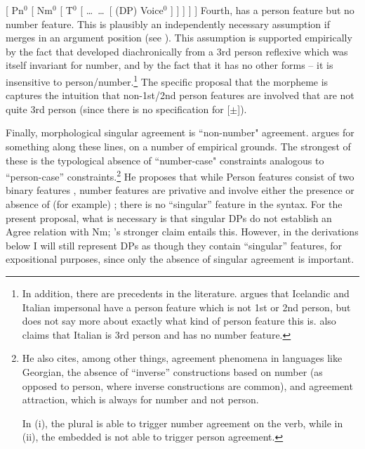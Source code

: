 \documentclass[output=paper]{langscibook}
\begin{document}
\ea
{ [ Pn$^0$ [ Nm$^0$ [ T$^0$ [ \dots\ \sti \dots\ [ (DP) Voice$^0$ ] ] ] ] ] }
\z
Fourth, \sti{} has a person feature but no number feature. This is plausibly an independently necessary assumption if \sti merges in an argument position (see \citealt{Wood2015book}). This assumption is supported empirically by the fact that \sti developed diachronically from a 3rd person reflexive which was itself invariant for number, and by the fact that it has no other forms -- it is insensitive to person\slash number.\footnote{In addition, there are precedents in the literature. \citet{DAlessandro:2003oy} argues that Icelandic \sti and Italian impersonal  have a person feature which is not 1st or 2nd person, but does not say more about exactly what kind of person feature this is. \citet{Taraldsen:1995om} also claims that Italian  is 3rd person and has no number feature.} The specific proposal that the morpheme is  captures the intuition that non-1st/2nd person features are involved that are not quite 3rd person (since there is no specification for [$\pm$]). 


\begin{sloppypar}
Finally, morphological singular agreement is “non-number" agreement. \citet{Nevins2010:ab} argues for something along these lines, on a number of empirical grounds. The strongest of these is the typological absence of “number-case" constraints analogous to “person-case” constraints.\footnote{He also cites, among other things, agreement phenomena in languages like Georgian, the absence of “inverse” constructions based on number (as opposed to person, where inverse constructions are common), and agreement attraction, which is always for number and not person. 
\begin{exe}
\end{exe} 
In (i), the plural  is able to trigger number agreement on the verb, while in (ii), the embedded  is not able to trigger person agreement.} He proposes that while Person features consist of two binary features , number features are privative and involve either the presence or absence of (for example) ; there is no “singular” feature in the syntax. For the present proposal, what is necessary is that singular DPs do not establish an Agree relation with Nm; \citeauthor{Nevins2010:ab}'s stronger claim entails this. However, in the derivations below I will still represent DPs as though they contain “singular” features, for expositional purposes, since only the absence of singular agreement is important.
\end{sloppypar}
\end{document}
